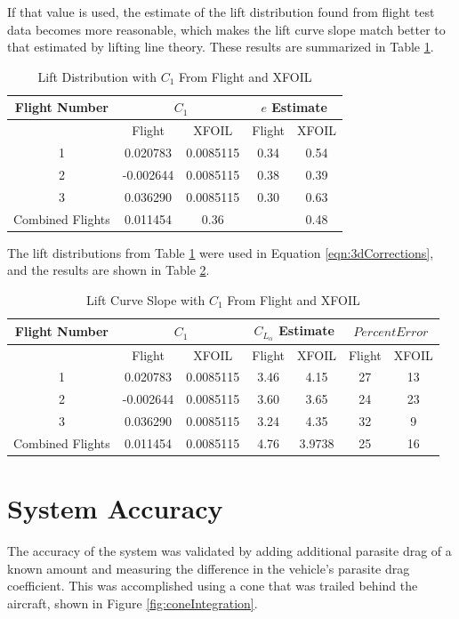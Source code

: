 If that value is used, the estimate of the lift distribution found from flight test data becomes more reasonable, which makes the lift curve slope match better to that estimated by lifting line theory. These results are summarized in Table \ref{table:eXfoil}.

\begin{table}[H]
\caption{Lift Distribution with $C_1$ From Flight and XFOIL}
\label{table:eXfoil}
\centering
\begin{tabular}{c c c c c}
\hline\hline
 Flight Number & \multicolumn{2}{c}{$C_1$} & \multicolumn{2}{c}{$e$ Estimate}\\
 \hline
 & Flight & XFOIL & Flight& XFOIL\\
1 & 0.020783 & 0.0085115 & 0.34 & 0.54\\
2 & -0.002644& 0.0085115 & 0.38 & 0.39\\
3 & 0.036290 & 0.0085115  & 0.30 & 0.63\\
\hline \hline
Combined Flights & 0.011454 & 0.36 & &0.48\\
\hline
\end{tabular}
\end{table}
The lift distributions from Table \ref{table:eXfoil} were used in Equation \ref{eqn:3dCorrections}, and the results are shown in Table \ref{table:CLAlphaXfoil}.
\begin{table}[H]
\caption{Lift Curve Slope with $C_1$ From Flight and XFOIL}
\label{table:CLAlphaXfoil}
\centering
\begin{tabular}{c c c c c c c}
\hline\hline
 Flight Number & \multicolumn{2}{c}{$C_1$} & \multicolumn{2}{c}{$C_{L_\alpha}$ Estimate} & \multicolumn{2}{c}{$Percent Error$}\\
 \hline
 & Flight & XFOIL & Flight& XFOIL & Flight & XFOIL\\
1 & 0.020783 & 0.0085115 & 3.46 & 4.15 & 27 & 13\\
2 & -0.002644 & 0.0085115 &  3.60&  3.65 & 24 & 23\\
3 & 0.036290 & 0.0085115  &  3.24 & 4.35 & 32 & 9\\
\hline \hline
Combined Flights & 0.011454 & 0.0085115 & 4.76 & 3.9738 & 25 & 16\\
\hline
\end{tabular}
\end{table}

\section{System Accuracy}
The accuracy of the system was validated by adding additional parasite drag of a known amount and measuring the difference in the vehicle's parasite drag coefficient. This was accomplished using a cone that was trailed behind the aircraft, shown in Figure \ref{fig:coneIntegration}. 

